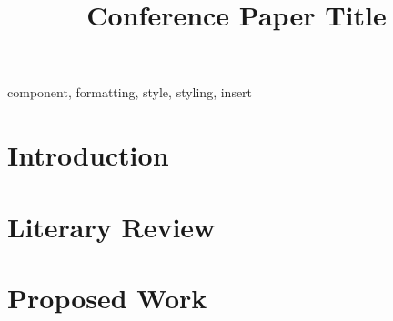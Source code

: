 \documentclass[conference]{IEEEtran}
\begin{document}
\title{Conference Paper Title}

\author{
}

\maketitle

\begin{abstract}


\end{abstract}

\begin{IEEEkeywords}
component, formatting, style, styling, insert
\end{IEEEkeywords}

\section{Introduction}
\label{sec:intro}


\section{Literary Review}


\section{Proposed Work}






\printbibliography
\end{document}
